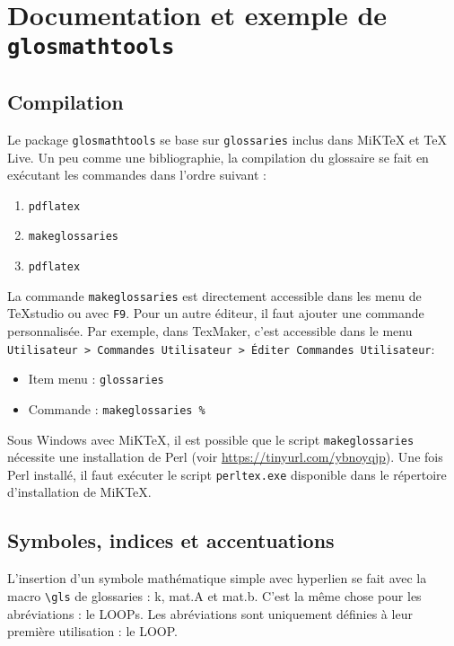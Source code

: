 \documentclass[projet,nohyperref,english,french]{ulthese}
\begin{document}
\frontmatter  
           
\frontispice
\printglossary[title=Nomenclature]

\mainmatter                     

\chapter{Documentation et exemple de \texttt{glosmathtools}}

\section{Compilation}
Le package \texttt{glosmathtools} se base sur \texttt{glossaries} inclus dans MiKTeX et TeX Live. Un peu comme une bibliographie, la compilation du glossaire se fait en exécutant les commandes dans l'ordre suivant :
\begin{enumerate}
	\item \texttt{pdflatex}
	\item \texttt{makeglossaries}
	\item \texttt{pdflatex}
\end{enumerate}
La commande \texttt{makeglossaries} est directement accessible dans les menu de TeXstudio ou avec \texttt{F9}. Pour un autre éditeur, il faut ajouter une commande personnalisée. Par exemple, dans TexMaker, c’est accessible dans le menu \texttt{Utilisateur > Commandes Utilisateur > Éditer Commandes Utilisateur}:
\begin{itemize}
	\item Item menu : \texttt{glossaries} 
	\item Commande : \texttt{makeglossaries \%}
\end{itemize}
Sous Windows avec MiKTeX, il est possible que le script \texttt{makeglossaries} nécessite une installation de Perl (voir \url{https://tinyurl.com/ybnoyqjp}). Une fois Perl installé, il faut exécuter le script \texttt{perltex.exe} disponible dans le répertoire d'installation de MiKTeX.

\section{Symboles, indices et accentuations}

L'insertion d'un symbole mathématique simple avec hyperlien se fait avec la macro \texttt{\textbackslash gls} de glossaries : \gls{k}, \gls{mat.A} et \gls{mat.b}. C'est la même chose pour les abréviations : le \Glspl{LOOP}. Les abréviations sont uniquement définies à leur première utilisation : le \gls{LOOP}.
\end{document}
